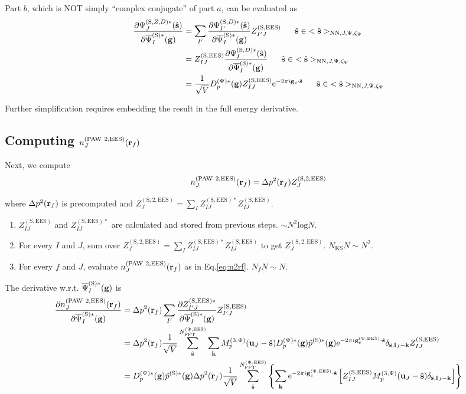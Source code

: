\documentclass[paper=a4, fontsize=11pt]{article} %
\numberwithin{equation}{section} %
\numberwithin{figure}{section} %
\numberwithin{table}{section} %
\newcommand{\p}{\partial}
\newcommand{\bu}{{\bf{u}}}
\newcommand{\bl}{{\bf{l}}}
\newcommand{\bk}{{\bf{k}}}
\newcommand{\bs}{{\bf{s}}}
\newcommand{\bg}{{\bf{g}}}
\newcommand{\br}{{\bf{r}}}
\newcommand{\hs}{{\hat{\bf{s}}}}
\newcommand{\rS}{{\mathrm{S}}}
\newcommand{\rEES}{{\mathrm{EES}}}
\newcommand{\rNN}{{\mathrm{NN}}}
\newcommand{\re}{{\mathrm{e}}}
\newcommand{\rP}{{\mathrm{PAW}}}
\newcommand{\rl}{{\mathrm{log}}}
\newcommand{\gc}{{\bg_c}}
\newcommand{\gcpEES}{{\bg_c^{(\Psi,\rEES)}}}
\newcommand{\igcs}{2\pi i\gc\cdot\hat \bs}
\newcommand{\psigsc}{{\overline \Psi_I^{(\rS)*}(\bg)}}
\newcommand{\NKS}{{N_{\mathrm{KS}}}}
\newcommand{\NFFTpEES}{{N^{\mathrm{(\Psi,\rEES})}_{\mathrm{FFT}}}}
\newcommand{\Dpgc}{{D^{(\Psi)*}_p(\bg)}}
\newcommand{\Mp}{{M_p^{(3,\Psi)}}}
\newcommand{\hsJp}{{<\hs>_{\rNN,J,\Psi,\zeta_\Psi}}}
\newcommand{\hsinJp}{{\ \ \ \ \ \hs  \in  \hsJp}}
\begin{document}
Part $b$, which is NOT simply ``complex conjugate'' of part $a$, can be evaluated as
\begin{equation}\label{eq:dZSDcdpsi}
\begin{split}
\frac{\p \Psi_J^{(\rS,Z,D)*}(\hs)}{\p \psigsc}
&= \sum_{I'} \frac{\p \Psi_{I'}^{(\rS,D)*}(\hat \bs)}{\p \psigsc} Z_{I'J}^{(\rS,\rEES)}\hsinJp \\
&= Z_{IJ}^{(\rS,\rEES)}\frac{\p \Psi_{I}^{(\rS,D)*}(\hat \bs)}{\p \psigsc} \hsinJp \\
& = \frac{1}{\sqrt V} \Dpgc  Z_{IJ}^{(\rS,\rEES)}  \re^{-\igcs}  \hsinJp \\
\end{split}
\end{equation}

Further simplification requires embedding the result in the full energy derivative.

\subsection{Computing $n_J^{(\rP\ 2,\rEES)}(\br_f)$}

Next, we compute
\begin{equation} \label{eq:n2rf}
n_J^{(\rP\ 2,\rEES)}(\br_f)= \Delta p^2(\br_f) Z_J^{(\rS,2,\rEES)}
\end{equation}

where $\Delta p^2(\br_f)$ is precomputed and $Z_{J}^{(\rS,2,\rEES)} = \sum_I Z_{IJ}^{(\rS,\rEES)*}Z_{IJ}^{(\rS,\rEES)}$.

\begin{enumerate}
\item $Z_{IJ}^{(\rS,\rEES)}$ and $Z_{IJ}^{(\rS,\rEES)*}$ are calculated and stored from previous steps. $ \sim N^2 \rl N$.
\item For every $I$ and $J$, sum over $Z_{J}^{(\rS,2,\rEES)} = \sum_I Z_{IJ}^{(\rS,\rEES)*}Z_{IJ}^{(\rS,\rEES)}$ to get $Z_{J}^{(\rS,2,\rEES)}$. $\NKS N \sim N^2$.
\item For every $f$ and $J$, evaluate $n_J^{(\rP\ 2,\rEES)}(\br_f)$ as in Eq.\eqref{eq:n2rf}. $N_f N \sim N$.
\end{enumerate}

The derivative w.r.t. $\psigsc$ is
\begin{equation} \label{eq:dn2dpsi}
\begin{split}
\frac{\p n_J^{(\rP\ 2,\rEES)}(\br_f)}{\p \psigsc}
&= \Delta p^2(\br_f)\sum_{I'}\frac{\p Z_{I'J}^{(\rS,\rEES)*}}{\p \psigsc} Z_{I'J}^{(\rS,\rEES)} \\
&= \Delta p^2(\br_f) \frac{1}{\sqrt{V}}\sum_{\hat \bs}^{\NFFTpEES} \sum_{\bk} \Mp(\bu_{J}-\hat \bs) \Dpgc \tilde p^{(\rS)*}(\bg)\re^{-2\pi i\gcpEES \cdot \hat\bs} \delta_{\hat \bs,\bl_J-\bk} Z_{IJ}^{(\rS,\rEES)}\\ 
&= \Dpgc \tilde p^{(\rS)*}(\bg) \Delta p^2(\br_f)\frac{1}{\sqrt{V}}\sum_{\hat \bs}^{\NFFTpEES}\left\{ \sum_\bk \re^{-2\pi i\gcpEES \cdot \hat\bs} \left[ Z_{IJ}^{(\rS,\rEES)} \Mp(\bu_{J}-\hat \bs)\delta_{\hat \bs,\bl_J-\bk} \right] \right\}\\
\end{split}
\end{equation}
\end{document}
